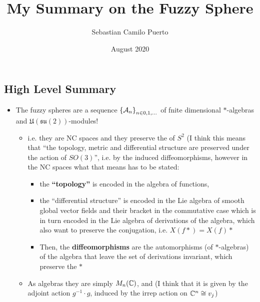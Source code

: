 \documentclass{article}
\title{My Summary on the Fuzzy Sphere}
\author{Sebastian Camilo Puerto}
\date{August 2020}
\begin{document}
\maketitle

\tableofcontents

\subsection{High Level Summary}

    \begin{itemize}

    \item The fuzzy spheres are a sequence $\left\{ \mathcal A_n \right\}_{n \in 0, 1, \dots}$ of fnite dimensional $*$-algebras and $\mathfrak{U(su(2))}$-modules!
    
        \begin{itemize}
            
        \item i.e. they are NC spaces and they preserve the  of $S^2$ (I think this means that ``the topology, metric and differential structure are preserved under the action of $SO(3)$'', i.e. by the induced diffeomorphisms, however in the NC spaces what that means has to be stated: 
        
            \begin{itemize}
            
            \item the \textbf{``topology''} is encoded in the algebra of functions,
            
            \item the ``differential structure'' is encoded in the Lie algebra of smooth global vector fields and their bracket in the commutative case which is in turn encoded in the Lie algebra of derivations of the algebra, {\tiny which also want to preserve the conjugation, i.e. $X(f*) = X(f)*$}
            
            \item Then, the \textbf{diffeomorphisms} are the automorphisms (of $*$-algebras) of the algebra that leave the set of derivations invariant, {\tiny which preserve the $*$}
                
            \end{itemize} 
            
        \item As algebras they are simply $M_n(\mathbb{C})$, and  (I think that it is given by the adjoint action $g^{-1}\cdot g$, induced by the irrep action on $\mathbb{C}^{n} \cong v_j$)
        

\end{itemize}
\end{itemize}
\end{document}
